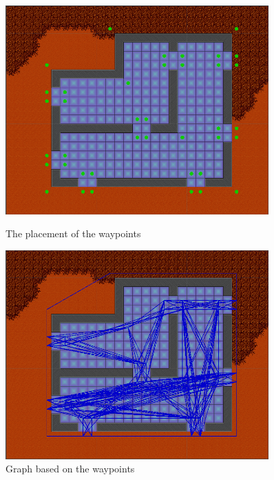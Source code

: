 \begin{figure}[H]
\centering
\begin{minipage}{.5\textwidth}
\centering
	\includegraphics[width=0.9\textwidth]{figures/astar/waypoints}
	\caption{The placement of the waypoints}
	\label{waypointsNode}
	\end{minipage}%
\begin{minipage}{.5\textwidth}
\centering
	\includegraphics[width=0.9\textwidth]{figures/astar/waypointsGraph}
	\caption{Graph based on the waypoints}
	\label{waypointgraph}
	\end{minipage}
\end{figure}

